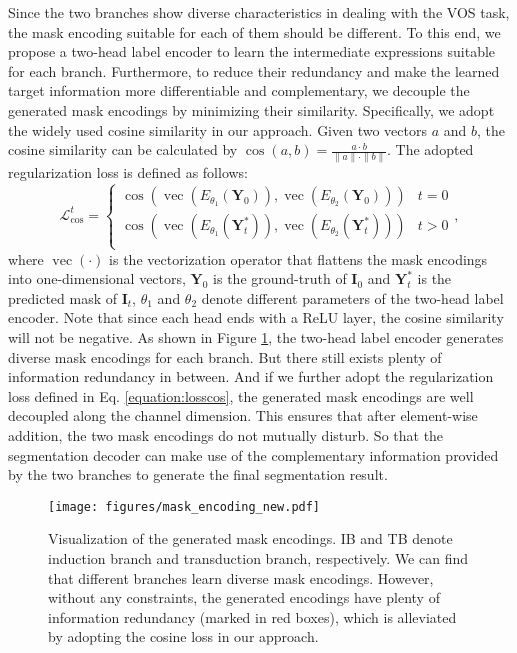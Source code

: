 \documentclass[10pt,twocolumn,letterpaper]{article}
\begin{document}
Since the two branches show diverse characteristics in dealing with the VOS task, the mask encoding suitable for each of them should be different. To this end, we propose a two-head label encoder to learn the intermediate expressions suitable for each branch. Furthermore, to reduce their redundancy and make the learned target information more differentiable and complementary, we decouple the generated mask encodings by minimizing their similarity. Specifically, we adopt the widely used cosine similarity in our approach. Given two vectors $a$ and $b$, the cosine similarity can be calculated by $\operatorname{cos}(a,b)=\frac{a \cdot b}{\|a\|\cdot\|b\|}$. The adopted regularization loss is defined as follows:
\begin{equation}\label{equation:losscos}
	\mathcal{L}_{\text{cos}}^t = 
	\left\{
	\begin{array}{lll}
		\cos (\operatorname{vec}(E_{\theta_1}(\mathbf{Y}_0)), \operatorname{vec}(E_{\theta_2}(\mathbf{Y}_0)) ) & t=0\\
		\cos (\operatorname{vec}(E_{\theta_1}(\mathbf{Y}_t^*)), \operatorname{vec}(E_{\theta_2}(\mathbf{Y}_t^*)) ) & t > 0\\
	\end{array}
	\right.,
\end{equation}
where $\operatorname{vec}(\cdot)$ is the vectorization operator that flattens the mask encodings into one-dimensional vectors, $\mathbf{Y}_0$ is the ground-truth of $\mathbf{I}_0$ and $\mathbf{Y}_t^*$ is the predicted mask of $\mathbf{I}_t$, $\theta_1$ and $\theta_2$ denote different parameters of the two-head label encoder. Note that since each head ends with a ReLU layer, the cosine similarity will not be negative.
As shown in Figure \ref{fig:mask_enc_show}, the two-head label encoder generates diverse mask encodings for each branch. But there still exists plenty of information redundancy in between. And if we further adopt the regularization loss defined in Eq. \eqref{equation:losscos}, the generated mask encodings are well decoupled along the channel dimension. This ensures that after element-wise addition, the two mask encodings do not mutually disturb. So that the segmentation decoder can make use of the complementary information provided by the two branches to generate the final segmentation result.

\begin{figure}[tbp]
	\begin{center}
\texttt{[image: figures/mask\_encoding\_new.pdf]}
	\vspace{-2.0em}
	\end{center}
	\caption{Visualization of the generated mask encodings. IB and TB denote induction branch and transduction branch, respectively.
We can find that different branches learn diverse mask encodings.
		However, without any constraints, the generated encodings have plenty of information redundancy (marked in red boxes), which is alleviated by adopting the cosine loss in our approach.}
	\label{fig:mask_enc_show}
	\vspace{-0.5em}
\end{figure}
\end{document}
